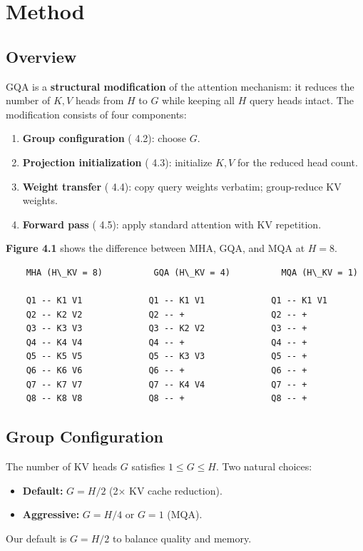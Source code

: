 
\section{Method}

\subsection{Overview}

GQA is a \textbf{structural modification} of the attention mechanism: it reduces 
the number of $K, V$ heads from $H$ to $G$ while keeping all $H$ query heads 
intact. The modification consists of four components:

\begin{enumerate}
\item \textbf{Group configuration} ( 4.2): choose $G$.
\item \textbf{Projection initialization} ( 4.3): initialize $K, V$ for the reduced head count.
\item \textbf{Weight transfer} ( 4.4): copy query weights verbatim; group-reduce KV weights.
\item \textbf{Forward pass} ( 4.5): apply standard attention with KV repetition.

\end{enumerate}
\textbf{Figure 4.1} shows the difference between MHA, GQA, and MQA at $H = 8$.

\begin{lstlisting}
    MHA (H\_KV = 8)          GQA (H\_KV = 4)          MQA (H\_KV = 1)

    Q1 -- K1 V1             Q1 -- K1 V1             Q1 -- K1 V1
    Q2 -- K2 V2             Q2 -- +                 Q2 -- +
    Q3 -- K3 V3             Q3 -- K2 V2             Q3 -- +
    Q4 -- K4 V4             Q4 -- +                 Q4 -- +
    Q5 -- K5 V5             Q5 -- K3 V3             Q5 -- +
    Q6 -- K6 V6             Q6 -- +                 Q6 -- +
    Q7 -- K7 V7             Q7 -- K4 V4             Q7 -- +
    Q8 -- K8 V8             Q8 -- +                 Q8 -- +
\end{lstlisting}

\subsection{Group Configuration}

The number of KV heads $G$ satisfies $1 \le G \le H$. Two natural choices:

\begin{itemize}
\item \textbf{Default:} $G = H / 2$ (2$\times$ KV cache reduction).
\item \textbf{Aggressive:} $G = H / 4$ or $G = 1$ (MQA).

\end{itemize}
Our default is $G = H / 2$ to balance quality and memory.

